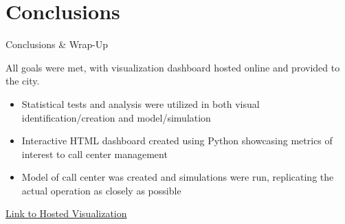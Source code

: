 \documentclass{beamer}
\begin{document}
\section{Conclusions}

\begin{frame}{Conclusions \& Wrap-Up}

All goals were met, with visualization dashboard hosted online and provided to the city.
\begin{itemize}
	\item Statistical tests and analysis were utilized in both visual identification/creation and model/simulation
	\item Interactive HTML dashboard created using Python showcasing metrics of interest to call center management
	\item Model of call center was created and simulations were run, replicating the actual operation as closely as possible
\end{itemize}
\centering \href{https://jdbul33.github.io/CallCenterDashboard.html}{Link to Hosted Visualization}


\end{frame}
\end{document}
